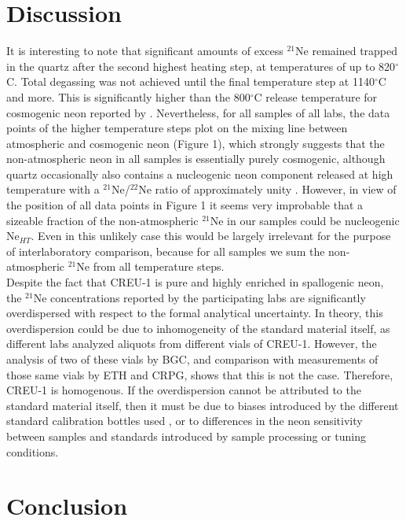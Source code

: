 \documentclass[authoryear,review,12pt]{elsarticle}
\begin{document}
\section{Discussion}
\label{sec:discussion}

It is interesting to note that significant amounts of excess $^{21}$Ne
remained trapped in the quartz after the second highest heating step,
at temperatures of up to 820$^\circ$C. Total degassing was not
achieved until the final temperature step at 1140$^\circ$C and
more. This is significantly higher than the 800$^\circ$C release
temperature for cosmogenic neon reported by
\citet{niedermann2002}. Nevertheless, for all samples of all labs, the
data points of the higher temperature steps plot on the mixing line
between atmospheric and cosmogenic neon (Figure 1),
which strongly suggests that the non-atmospheric neon in all samples is
essentially purely cosmogenic, although quartz occasionally also
contains a nucleogenic neon component released at high temperature with
a $^{21}$Ne/$^{22}$Ne ratio of approximately unity
\citep[Ne$_{HT}$,][]{niedermann1994, niedermann2002}. However, in view
of the position of all data points in Figure 1 it
seems very improbable that a sizeable fraction of the non-atmospheric
$^{21}$Ne in our samples could be nucleogenic Ne$_{HT}$. Even in this
unlikely case this would be largely irrelevant for the purpose of
interlaboratory comparison, because for all samples we sum the
non-atmospheric $^{21}$Ne from all temperature steps.\\

Despite the fact that CREU-1 is pure and highly enriched in
spallogenic neon, the $^{21}$Ne concentrations reported by the
participating labs are significantly overdispersed with respect to the
formal analytical uncertainty.  In theory, this overdispersion could
be due to inhomogeneity of the standard material itself, as different
labs analyzed aliquots from different vials of CREU-1. However, the
analysis of two of these vials by BGC, and comparison with
measurements of those same vials by ETH and CRPG, shows that this is
not the case. Therefore, CREU-1 is homogenous.  If the overdispersion
cannot be attributed to the standard material itself, then it must be
due to biases introduced by the different standard calibration bottles
used \citep{heber2009}, or to differences in the neon sensitivity
between samples and standards introduced by sample processing or
tuning conditions.

\section{Conclusion}
\label{sec:conclusion}
\end{document}
